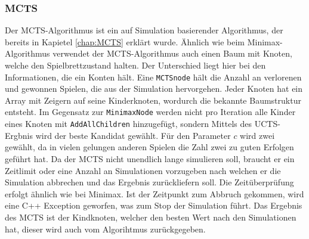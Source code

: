 \documentclass[12pt,a4paper,bibliography=totocnumbered,listof=totocnumbered]{article}
\begin{document}
\subsubsection{MCTS}
Der MCTS-Algorithmus ist ein auf Simulation basierender Algorithmus, der bereits in Kapietel \ref{chap:MCTS} erklärt wurde.
Ähnlich wie beim Minimax-Algorithmus verwendet der MCTS-Algorithmus auch einen Baum mit Knoten, welche den Spielbrettzustand halten.
Der Unterschied liegt hier bei den Informationen, die ein Konten hält. Eine \texttt{MCTSnode} hält die Anzahl an verlorenen und gewonnen Spielen,
die aus der Simulation hervorgehen. Jeder Knoten hat ein Array mit Zeigern auf seine Kinderknoten, wordurch die bekannte Baumstruktur entsteht.
Im Gegensatz zur \texttt{MinimaxNode} werden nicht pro Iteration alle Kinder eines Knoten mit \texttt{AddAllChildren} hinzugefügt, sondern Mittels des 
UCTS-Ergbnis wird der beste Kandidat gewählt. Für den Parameter $c$ wird zwei gewählt, da in vielen gelungen anderen Spielen die Zahl zwei 
zu guten Erfolgen geführt hat. Da der MCTS nicht unendlich lange simulieren soll, braucht er ein Zeitlimit oder eine Anzahl an Simulationen vorzugeben
nach welchen er die Simulation abbrechen und das Ergebnis zurückliefern soll. Die Zeitüberprüfung erfolgt ähnlich wie bei Minimax.
Ist der Zeitpunkt zum Abbruch gekommen, wird eine C++ Exception geworfen, was zum Stop der Simulation führt. 
Das Ergebnis des MCTS ist der Kindknoten, welcher den besten Wert nach den Simulationen hat, dieser wird auch vom Algorihtmus zurückgegeben.
\end{document}
